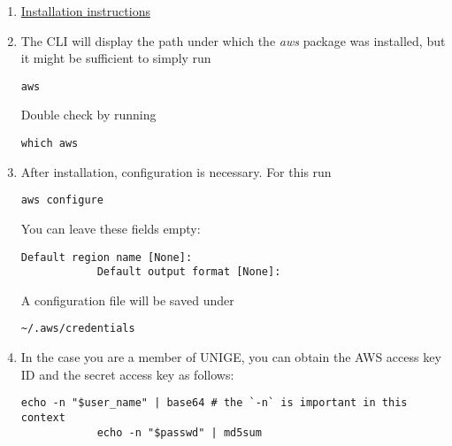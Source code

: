 \documentclass[12pt, a4paper]{article}
\numberwithin{equation}{section}
\theoremstyle{definition}
\theoremstyle{definition}
\begin{document}
	\begin{enumerate}
		\item \href{https://docs.aws.amazon.com/cli/latest/userguide/getting-started-install.html#getting-started-install-instructions}{Installation instructions}
		\item The CLI will display the path under which the \textit{aws} package was installed, but it might be sufficient to simply run 
		
		\begin{lstlisting}[style=mystylebash, label=alg:aws, xleftmargin=\parindent]
			aws
		\end{lstlisting}
		
		Double check by running 
		
		\begin{lstlisting}[style=mystylebash, label=alg:aws_path, xleftmargin=\parindent]
			which aws
		\end{lstlisting}
		
		\item After installation, configuration is necessary. For this run
		
		\begin{lstlisting}[style=mystylebash, label=alg:aws_configure, xleftmargin=\parindent]
			aws configure
		\end{lstlisting}
		
		You can leave these fields empty:
		
		\begin{lstlisting}[style=mystylebash, label=alg:aws_configure__default_reg, xleftmargin=\parindent]
			Default region name [None]:
			Default output format [None]:
		\end{lstlisting}
		
		A configuration file will be saved under 
		
		\begin{lstlisting}[style=mystylebash, label=alg:aws__config_file, xleftmargin=\parindent]
			~/.aws/credentials
		\end{lstlisting}
		
		\item In the case you are a member of UNIGE, you can obtain the AWS access key ID and the secret access key as follows:
		
		\begin{lstlisting}[style=mystylebash, label=alg:aws__access_secret_key, xleftmargin=\parindent]
			echo -n "$user_name" | base64 # the `-n` is important in this context
			echo -n "$passwd" | md5sum
		\end{lstlisting}
		

\end{enumerate}
\end{document}
